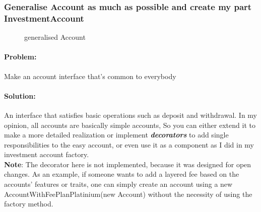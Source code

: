 \documentclass[a4paper,12pt]{report}
\begin{document}
\subsubsection{Generalise Account as much as possible and create my part InvestmentAccount}
\begin{figure}[H]
	\centering{}
	\caption{generalised Account}
	\label{img:invAccount}
	\end{figure}

	\paragraph{Problem:} Make an account interface that's common to everybody

	\paragraph{Solution:} An interface that satisfies basic operations such as deposit and withdrawal. In my opinion, all accounts are basically simple accounts, So you can either extend it to make a more detailed realization or implement \textbf{\textit{decorators}} to add single responsibilities to the easy account, or even use it as a component as I did in my investment account factory.
	\\ \textbf{Note}: The decorator here is not implemented, because it was designed for open changes. As an example, if someone wants to add a layered fee based on the accounts' features or traits, one can simply create an account using a new AccountWithFeePlanPlatinium(new Account) without the necessity of using the factory method.
\end{document}
